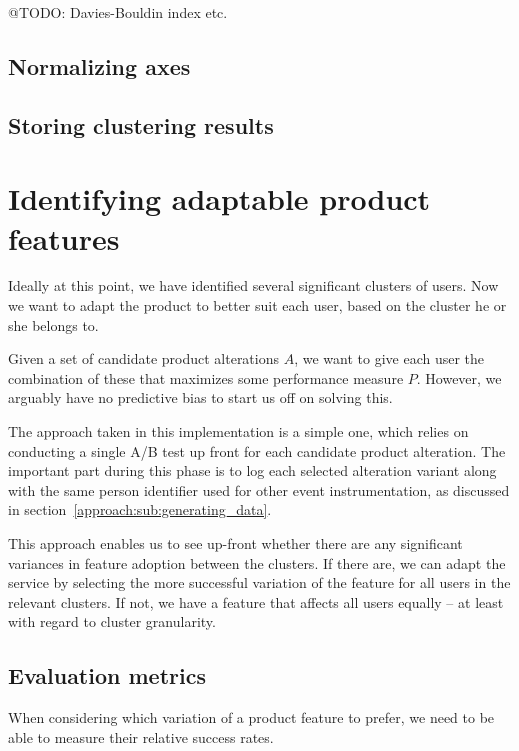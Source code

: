 @TODO: Davies-Bouldin index etc.

\subsection{Normalizing axes}
\label{approach:sub:normalizing_axes}

\subsection{Storing clustering results}
\label{approach:sub:storing_results}

\section{Identifying adaptable product features}
\label{approach:sec:identifying_adaptability}

Ideally at this point, we have identified several significant clusters of users. Now we want to adapt the product to better suit each user, based on the cluster he or she belongs to.

Given a set of candidate product alterations $A$, we want to give each user the combination of these that maximizes some performance measure $P$. However, we arguably have no predictive bias to start us off on solving this.

The approach taken in this implementation is a simple one, which relies on conducting a single A/B test up front for each candidate product alteration. The important part during this phase is to log each selected alteration variant along with the same person identifier used for other event instrumentation, as discussed in section~\ref{approach:sub:generating_data}.

This approach enables us to see up-front whether there are any significant variances in feature adoption between the clusters. If there are, we can adapt the service by selecting the more successful variation of the feature for all users in the relevant clusters. If not, we have a feature that affects all users equally -- at least with regard to cluster granularity.

\subsection{Evaluation metrics} %
\label{approach:sec:evaluation_metrics}

When considering which variation of a product feature to prefer, we need to be able to measure their relative success rates.

